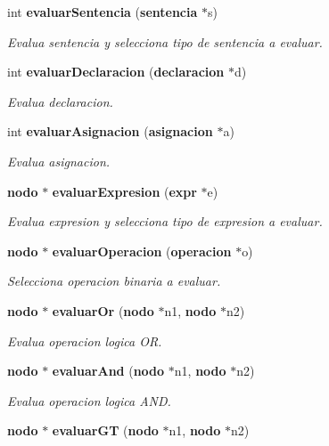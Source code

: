 \begin{CompactItemize}
int {\bf evaluar\-Sentencia} ({\bf sentencia} $\ast$s)
\begin{CompactList}\small\item\em Evalua sentencia y selecciona tipo de sentencia a evaluar. \item\end{CompactList}\item 
int {\bf evaluar\-Declaracion} ({\bf declaracion} $\ast$d)
\begin{CompactList}\small\item\em Evalua declaracion. \item\end{CompactList}\item 
int {\bf evaluar\-Asignacion} ({\bf asignacion} $\ast$a)
\begin{CompactList}\small\item\em Evalua asignacion. \item\end{CompactList}\item 
{\bf nodo} $\ast$ {\bf evaluar\-Expresion} ({\bf expr} $\ast$e)
\begin{CompactList}\small\item\em Evalua expresion y selecciona tipo de expresion a evaluar. \item\end{CompactList}\item 
{\bf nodo} $\ast$ {\bf evaluar\-Operacion} ({\bf operacion} $\ast$o)
\begin{CompactList}\small\item\em Selecciona operacion binaria a evaluar. \item\end{CompactList}\item 
{\bf nodo} $\ast$ {\bf evaluar\-Or} ({\bf nodo} $\ast$n1, {\bf nodo} $\ast$n2)
\begin{CompactList}\small\item\em Evalua operacion logica OR. \item\end{CompactList}\item 
{\bf nodo} $\ast$ {\bf evaluar\-And} ({\bf nodo} $\ast$n1, {\bf nodo} $\ast$n2)
\begin{CompactList}\small\item\em Evalua operacion logica AND. \item\end{CompactList}\item 
{\bf nodo} $\ast$ {\bf evaluar\-GT} ({\bf nodo} $\ast$n1, {\bf nodo} $\ast$n2)

\end{CompactItemize}
